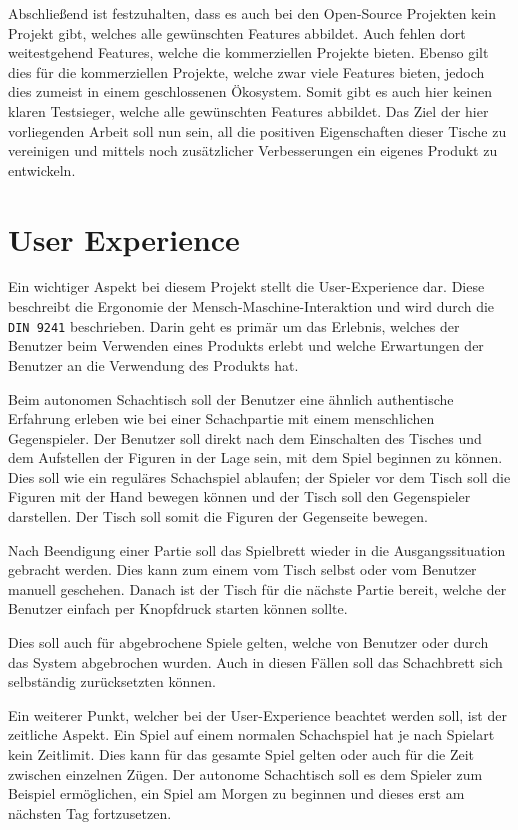 \pagebreak

Abschließend ist festzuhalten, dass es auch bei den Open-Source
Projekten kein Projekt gibt, welches alle gewünschten Features abbildet.
Auch fehlen dort weitestgehend Features, welche die kommerziellen
Projekte bieten. Ebenso gilt dies für die kommerziellen Projekte, welche
zwar viele Features bieten, jedoch dies zumeist in einem geschlossenen
Ökosystem. Somit gibt es auch hier keinen klaren Testsieger, welche alle
gewünschten Features abbildet. Das Ziel der hier vorliegenden Arbeit
soll nun sein, all die positiven Eigenschaften dieser Tische zu
vereinigen und mittels noch zusätzlicher Verbesserungen ein eigenes
Produkt zu entwickeln.

\hypertarget{user-experience}{%
\section{User Experience}\label{user-experience}}

Ein wichtiger Aspekt bei diesem Projekt stellt die User-Experience dar.
Diese beschreibt die Ergonomie der Mensch-Maschine-Interaktion und wird
durch die \passthrough{\lstinline!DIN 9241!}\cite{din9241}
beschrieben. Darin geht es primär um das Erlebnis, welches der Benutzer
beim Verwenden eines Produkts erlebt und welche Erwartungen der Benutzer
an die Verwendung des Produkts hat.

Beim autonomen Schachtisch soll der Benutzer eine ähnlich authentische
Erfahrung erleben wie bei einer Schachpartie mit einem menschlichen
Gegenspieler. Der Benutzer soll direkt nach dem Einschalten des Tisches
und dem Aufstellen der Figuren in der Lage sein, mit dem Spiel beginnen
zu können. Dies soll wie ein reguläres Schachspiel ablaufen; der Spieler
vor dem Tisch soll die Figuren mit der Hand bewegen können und der Tisch
soll den Gegenspieler darstellen. Der Tisch soll somit die Figuren der
Gegenseite bewegen.

Nach Beendigung einer Partie soll das Spielbrett wieder in die
Ausgangssituation gebracht werden. Dies kann zum einem vom Tisch selbst
oder vom Benutzer manuell geschehen. Danach ist der Tisch für die
nächste Partie bereit, welche der Benutzer einfach per Knopfdruck
starten können sollte.

Dies soll auch für abgebrochene Spiele gelten, welche von Benutzer oder
durch das System abgebrochen wurden. Auch in diesen Fällen soll das
Schachbrett sich selbständig zurücksetzten können.

Ein weiterer Punkt, welcher bei der User-Experience beachtet werden
soll, ist der zeitliche Aspekt. Ein Spiel auf einem normalen Schachspiel
hat je nach Spielart kein Zeitlimit. Dies kann für das gesamte Spiel
gelten oder auch für die Zeit zwischen einzelnen Zügen. Der autonome
Schachtisch soll es dem Spieler zum Beispiel ermöglichen, ein Spiel am
Morgen zu beginnen und dieses erst am nächsten Tag fortzusetzen.

